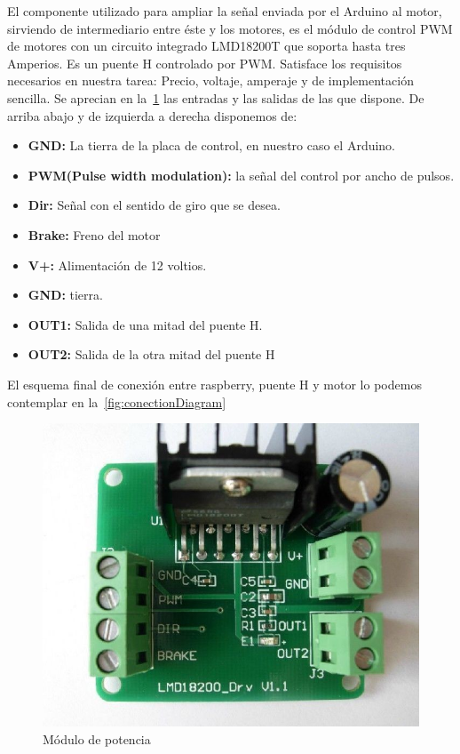 
El componente utilizado para ampliar la señal enviada por el Arduino al motor, sirviendo de intermediario entre éste y los motores, es el módulo de control PWM de motores con un circuito integrado LMD18200T que soporta hasta tres Amperios.
Es un puente H controlado por PWM. Satisface los requisitos necesarios en nuestra tarea: Precio, voltaje, amperaje y de implementación sencilla.
Se aprecian en la~\cref{fig:Hbridge} las entradas y las salidas de las que dispone.
De arriba abajo y de izquierda a derecha disponemos de:

\begin{itemize}
	\item \textbf{GND:} La tierra de la placa de control, en nuestro caso el Arduino.
	\item \textbf{PWM(Pulse width modulation):} la señal del control por ancho de pulsos.
	\item \textbf{Dir:} Señal con el sentido de giro que se desea.
	\item \textbf{Brake:} Freno del motor
	\item \textbf{V+:} Alimentación de 12 voltios.
	\item \textbf{GND:} tierra.
	\item \textbf{OUT1:} Salida de una mitad del puente H\@.
	\item \textbf{OUT2:} Salida de la otra mitad del puente H
\end{itemize}

El esquema final de conexión entre raspberry, puente H y motor lo podemos contemplar en la~\cref{fig:conectionDiagram}\\

\begin{figure}[H]
		\centering
		\includegraphics[scale = 0.3]{part/Proyecto_ejecutivo/memoria_constructiva/motor/img/modulopot}
		\caption{Módulo de potencia}\label{fig:Hbridge}
\end{figure}

